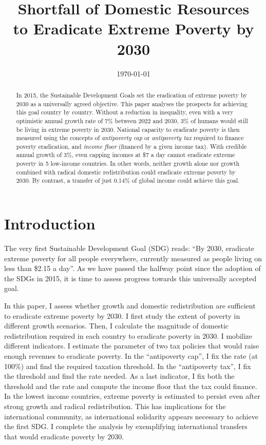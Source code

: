 \documentclass[12pt,english]{article}
\title{Shortfall of Domestic Resources\\ to Eradicate Extreme Poverty by 2030}
\date{\today} %
\makeatletter
\renewcommand\tableofcontents{%
    \@starttoc{toc}%
}
\makeatother
\begin{document}
\sloppy
\maketitle




\begin{abstract}
In 2015, the Sustainable Development Goals set the eradication of extreme poverty by 2030 as a universally agreed objective. This paper analyses the prospects for achieving this goal country by country. Without a reduction in inequality, even with a very optimistic annual growth rate of 7\% between 2022 and 2030, 3\% of humans would still be living in extreme poverty in 2030. National capacity to eradicate poverty is then measured using the concepts of \textit{antipoverty cap} or \textit{antipoverty tax} required to finance poverty eradication, and \textit{income floor} (financed by a given income tax). With credible annual growth of 3\%, even capping incomes at \$7 a day cannot eradicate extreme poverty in 5 low-income countries. In other words, neither growth alone nor growth combined with radical domestic redistribution could eradicate extreme poverty by 2030. By contrast, a transfer of just 0.14\% of global income could achieve this goal.
\end{abstract}


\clearpage
\tableofcontents



\section{Introduction}%

The very first Sustainable Development Goal (SDG) %
reads: ``By 2030, eradicate extreme poverty for all people everywhere, currently measured as people living on less than \$2.15 a day''. As we have passed the halfway point since the adoption of the SDGs in 2015, it is time to assess progress towards this universally accepted goal. 

In this paper, I assess whether growth and domestic redistribution are sufficient to eradicate extreme poverty by 2030. I first study the extent of poverty in different growth scenarios. Then, I calculate the magnitude of domestic redistribution required in each country to eradicate poverty in 2030. I mobilize different indicators. I estimate the parameter of two tax policies that would raise enough revenues to eradicate poverty. In the ``antipoverty cap'', I fix the rate (at 100\%) and find the required taxation threshold. In the ``antipoverty tax'', I fix the threshold and find the rate needed. As a last indicator, I fix both the threshold and the rate and compute the income floor that the tax could finance. In the lowest income countries, extreme poverty is estimated to persist even after strong growth and radical redistribution. %
This has implications for the international community, as international solidarity appears necessary to achieve the first SDG. I complete the analysis by exemplifying international transfers that would eradicate poverty by 2030.
\end{document}
